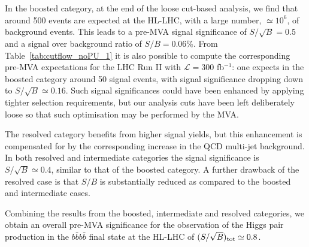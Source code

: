 \begin{table}[t]
  \centering
  \scriptsize
  
  $\,$ \\
  \vspace{0.5cm}
  
  $\,$ \\
  \vspace{0.5cm}
    
    \caption{\small The cross-sections
      for the signal and the background
      processes at different steps of the
      analysis (see Table~\ref{tab:cutflowdetails}), for the resolved (upper),
      intermediate (middle) and boosted
      (lower table) categories, for the analysis
      without PU.
      For each step, the signal over
      background ratio $S/B$, and the signal
      significance $S/\sqrt{B}$ for
       $\mathcal{L}=3$ ab$^{-1}$ are also provided, considering either
      the total background or only the $4b$ component.
 \label{tab:cutflow_noPU_1}}
\end{table}

%
In the boosted category, at the end of the loose cut-based
analysis, we find that around 500 events
are expected
at the HL-LHC, with a large number,
$\simeq 10^6$, of background events.
%
This leads to a pre-MVA signal significance of
$S/\sqrt{B}=0.5$ and a signal over background
ratio of $S/B=0.06\%$.
%
From Table~\ref{tab:cutflow_noPU_1}
it is also possible to compute the corresponding pre-MVA
expectations for the LHC Run II with
$\mathcal{L}=300$ fb$^{-1}$: one expects in the boosted
category around
50 signal events, with signal significance dropping down to
$S/\sqrt{B}\simeq 0.16$.
%
Such signal
significances could have been enhanced
by applying tighter selection requirements,
but our analysis cuts have been left deliberately loose
so that such optimisation may be performed by the MVA.

The resolved category benefits from higher signal yields,
but this enhancement is compensated for by the
corresponding
increase in the QCD multi-jet background.
%
In both resolved and intermediate categories
the signal significance is
$S/\sqrt{B}\simeq 0.4$,
similar to that of the boosted category.
%
A further
drawback of the resolved case is
that $S/B$
is substantially reduced as compared to the boosted and
intermediate cases.


Combining the results
from the boosted, intermediate and resolved categories,
we obtain an overall pre-MVA 
significance for the observation of the Higgs pair production
in the $b\bar{b}b\bar{b}$ final
state at the HL-LHC 
of  $(S/\sqrt{B})_{\rm tot} \simeq 0.8$.


